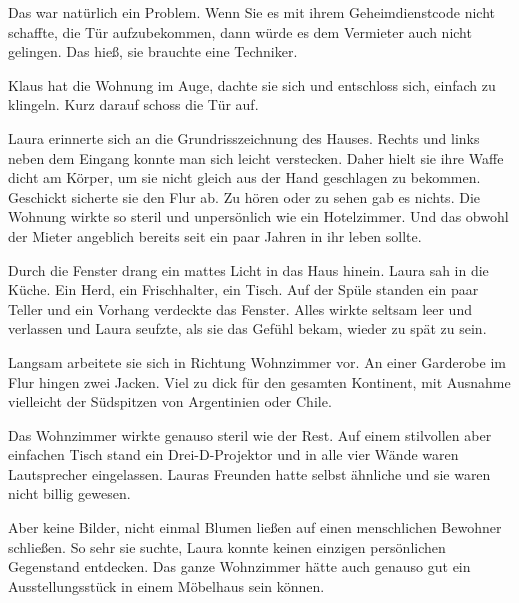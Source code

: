 \par

Das war natürlich ein Problem. Wenn Sie es mit ihrem Geheimdienstcode nicht schaffte, die Tür aufzubekommen, dann würde es dem Vermieter auch nicht gelingen. Das hieß, sie brauchte eine Techniker.

\par

Klaus hat die Wohnung im Auge, dachte sie sich und entschloss sich, einfach zu klingeln. Kurz darauf schoss die Tür auf.

\par

Laura erinnerte sich an die Grundrisszeichnung des Hauses. Rechts und links neben dem Eingang konnte man sich leicht verstecken. Daher hielt sie ihre Waffe dicht am Körper, um sie nicht gleich aus der Hand geschlagen zu bekommen. Geschickt sicherte sie den Flur ab. Zu hören oder zu sehen gab es nichts. Die Wohnung wirkte so steril und unpersönlich wie ein Hotelzimmer. Und das obwohl der Mieter angeblich bereits seit ein paar Jahren in ihr leben sollte.

\par

Durch die Fenster drang ein mattes Licht in das Haus hinein. Laura sah in die Küche. Ein Herd, ein Frischhalter, ein Tisch. Auf der Spüle standen ein paar Teller und ein Vorhang verdeckte das Fenster. Alles wirkte seltsam leer und verlassen und Laura seufzte, als sie das Gefühl bekam, wieder zu spät zu sein.

\par

Langsam arbeitete sie sich in Richtung Wohnzimmer vor. An einer Garderobe im Flur hingen zwei Jacken. Viel zu dick für den gesamten Kontinent, mit Ausnahme vielleicht der Südspitzen von Argentinien oder Chile.

\par

Das Wohnzimmer wirkte genauso steril wie der Rest. Auf einem stilvollen aber einfachen Tisch stand ein Drei-D-Projektor und in alle vier Wände waren Lautsprecher eingelassen. Lauras Freunden hatte selbst ähnliche und sie waren nicht billig gewesen.

\par

Aber keine Bilder, nicht einmal Blumen ließen auf einen menschlichen Bewohner schließen. So sehr sie suchte, Laura konnte keinen einzigen persönlichen Gegenstand entdecken. Das ganze Wohnzimmer hätte auch genauso gut ein Ausstellungsstück in einem Möbelhaus sein können.

